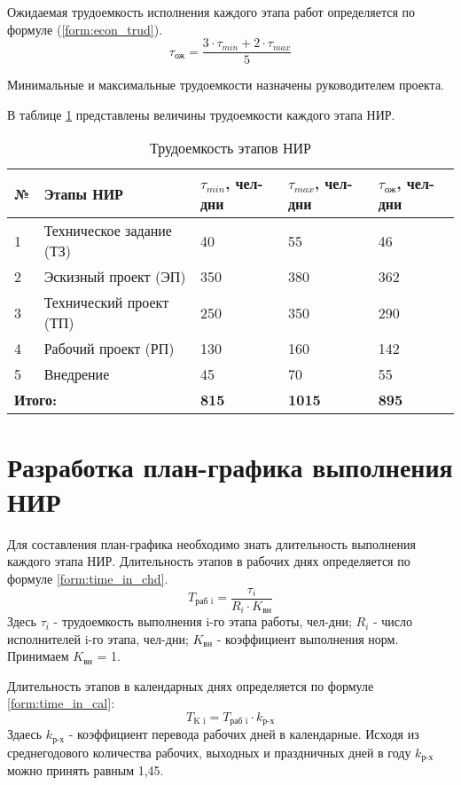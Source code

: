 Ожидаемая трудоемкость исполнения каждого этапа работ определяется по формуле (\ref{form:econ_trud}).
\begin{equation}
	\tau_\text{ож} = \frac{3 \cdot \tau_{min} + 2 \cdot \tau_{max}}{5}
	\label{form:econ_trud}
\end{equation}

Минимальные и максимальные трудоемкости назначены руководителем проекта.

В таблице \ref{tab:econ_nir_trud} представлены величины трудоемкости каждого этапа НИР.
\begin{table}[h]
	\begin{center}
		\caption{Трудоемкость этапов НИР}
		\begin{tabular}{|p{6mm}|p{50mm}|p{29mm}|p{29mm}|p{29mm}|}
  		\hline
№ & Этапы НИР &  $\tau_{min}$, чел-дни &  $\tau_{max}$, чел-дни & $\tau_\text{ож}$, чел-дни \\ \hline
1 & Техническое задание (ТЗ) & 40 & 55 & 46 \\ \hline
2 & Эскизный проект (ЭП) & 350 & 380 & 362 \\ \hline
3 & Технический проект (ТП) & 250 & 350 & 290 \\ \hline
4 & Рабочий проект (РП) & 130 & 160 & 142 \\ \hline
5 & Внедрение & 45 & 70 & 55 \\ \hline
\multicolumn{2}{|p{55mm}|}{\textbf{Итого:}} & \textbf{815} & \textbf{1015} & \textbf{895} \\\hline
		\end{tabular}
		\label{tab:econ_nir_trud}
	\end{center}
\end{table}

\clearpage
\section{Разработка план-графика выполнения НИР}
Для составления план-графика необходимо знать длительность выполнения каждого этапа НИР. Длительность этапов в рабочих днях определяется по формуле \ref{form:time_in_chd}.
\begin{equation}
	T_\text{раб i} = \frac{ \tau_i } { R_i \cdot K_\text{вн} }
	\label{form:time_in_chd}
\end{equation}
Здесь $\tau_i$ - трудоемкость выполнения i-го этапа работы, чел-дни; $R_i$ - число исполнителей i-го этапа, чел-дни; $K_\text{вн}$ - коэффициент выполнения норм. Принимаем $K_\text{вн}$ = 1.

Длительность этапов в календарных днях определяется по формуле \ref{form:time_in_cal}:
\begin{equation}
	T_\text{K i} = T_\text{раб i} \cdot k_\text{р-х}
	\label{form:time_in_cal}
\end{equation}
Здаесь $k_\text{р-х}$ - коэффициент перевода рабочих дней в календарные. Исходя из среднегодового количества рабочих, выходных и праздничных дней в году $k_\text{р-х}$ можно принять равным 1,45.

